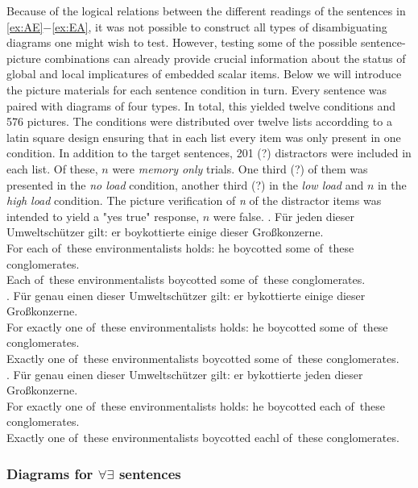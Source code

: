 \documentclass[a4paper,10pt]{article}
\begin{document}
Because of the logical relations between the different readings of the sentences in \ref{ex:AE}$-$\ref{ex:EA}, it was not possible to construct all types of disambiguating diagrams one might wish to test. However, testing some of the possible sentence-picture combinations can already provide crucial information about the status of global and local implicatures of embedded scalar items. Below we will introduce the picture materials for each sentence condition in turn. Every sentence was paired with diagrams of four types. In total, this yielded twelve conditions and 576 pictures. The conditions were distributed over twelve lists accordding to a latin square design ensuring that in each list every item was only present in one condition. In addition to the target sentences, 201 (?) distractors were included in each list. Of these, $n$ were {\it memory only} trials. One third (?) of them was presented in the {\it no load} condition, another third (?) in the {\it low load} and $n$ in the {\it high load} condition. The picture verification of {\it n} of the distractor items was intended to yield a "yes true" response, $n$ were false.
\small
\exg. \label{ex:AE}F{\"u}r jeden dieser Umweltsch{\"u}tzer gilt: er  boykottierte einige dieser Gro{\ss}konzerne.\\
For each of\ these environmentalists holds: he boycotted some of\ these conglomerates.\\
 Each of\ these environmentalists boycotted some of\ these conglomerates.\\

\exg. \label{ex:EE}F{\"u}r genau einen dieser Umweltsch{\"u}tzer gilt: er bykottierte einige dieser Gro{\ss}konzerne.\\
For exactly one of\ these environmentalists holds: he boycotted some of\ these conglomerates.\\
 Exactly one of\ these environmentalists boycotted some of\ these conglomerates.\\

\exg. \label{ex:EA}F{\"u}r genau einen dieser Umweltsch{\"u}tzer gilt: er bykottierte jeden dieser Gro{\ss}konzerne.\\
For exactly one of\ these environmentalists holds: he boycotted each of\ these conglomerates.\\
Exactly one of\ these environmentalists boycotted eachl of\ these conglomerates.\\

\normalsize

\subsubsection{Diagrams for $\forall \exists$ sentences}
\end{document}
